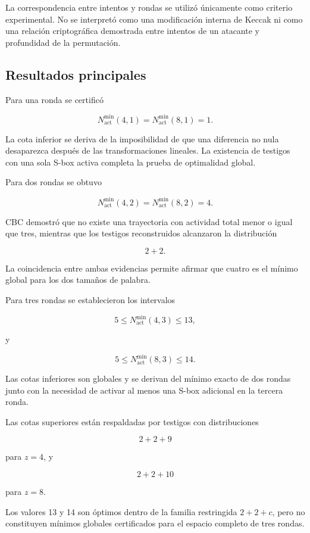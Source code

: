 La correspondencia entre intentos y rondas se utilizó únicamente como
criterio experimental. No se interpretó como una modificación interna de
Keccak ni como una relación criptográfica demostrada entre intentos de un
atacante y profundidad de la permutación.


\subsection{Resultados principales}
\label{subsec:conclusiones_resultados}

Para una ronda se certificó

\[
N_{\mathrm{act}}^{\min}(4,1)
=
N_{\mathrm{act}}^{\min}(8,1)
=
1.
\]

La cota inferior se deriva de la imposibilidad de que una diferencia no
nula desaparezca después de las transformaciones lineales. La existencia
de testigos con una sola S-box activa completa la prueba de optimalidad
global.

Para dos rondas se obtuvo

\[
N_{\mathrm{act}}^{\min}(4,2)
=
N_{\mathrm{act}}^{\min}(8,2)
=
4.
\]

CBC demostró que no existe una trayectoria con actividad total menor o
igual que tres, mientras que los testigos reconstruidos alcanzaron la
distribución

\[
2+2.
\]

La coincidencia entre ambas evidencias permite afirmar que cuatro es el
mínimo global para los dos tamaños de palabra.

Para tres rondas se establecieron los intervalos

\[
5
\leq
N_{\mathrm{act}}^{\min}(4,3)
\leq
13,
\]

y

\[
5
\leq
N_{\mathrm{act}}^{\min}(8,3)
\leq
14.
\]

Las cotas inferiores son globales y se derivan del mínimo exacto de dos
rondas junto con la necesidad de activar al menos una S-box adicional en
la tercera ronda.

Las cotas superiores están respaldadas por testigos con distribuciones

\[
2+2+9
\]

para $z=4$, y

\[
2+2+10
\]

para $z=8$.

Los valores 13 y 14 son óptimos dentro de la familia restringida
$2+2+c$, pero no constituyen mínimos globales certificados para el espacio
completo de tres rondas.


